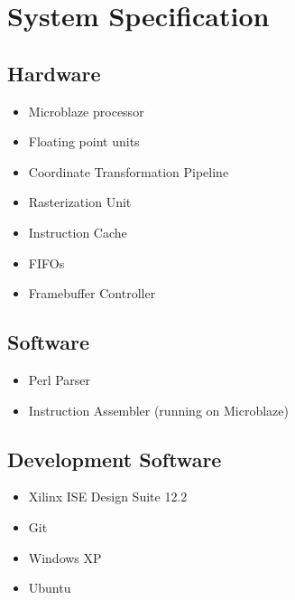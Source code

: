 \documentclass[letterpaper,10pt]{article}
\begin{document}
\section{System Specification}
\subsection{Hardware}
\begin{itemize}

\item Microblaze processor

\item Floating point units

\item Coordinate Transformation Pipeline

\item Rasterization Unit

\item Instruction Cache

\item FIFOs

\item Framebuffer Controller

\end{itemize}

\subsection{Software}
\begin{itemize}

\item Perl Parser

\item Instruction Assembler (running on Microblaze)

\end{itemize}

\subsection{Development Software}
\begin{itemize}

\item Xilinx ISE Design Suite 12.2

\item Git

\item Windows XP

\item Ubuntu

\end{itemize}
\end{document}
